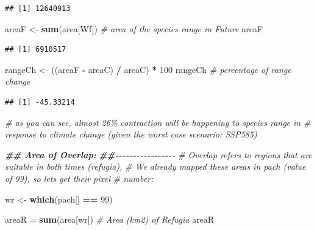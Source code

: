 \documentclass[
]{article}
\newenvironment{Shaded}{\begin{snugshade}}{\end{snugshade}}
\newcommand{\CommentTok}[1]{\textcolor[rgb]{0.56,0.35,0.01}{\textit{#1}}}
\newcommand{\DecValTok}[1]{\textcolor[rgb]{0.00,0.00,0.81}{#1}}
\newcommand{\DocumentationTok}[1]{\textcolor[rgb]{0.56,0.35,0.01}{\textbf{\textit{#1}}}}
\newcommand{\FunctionTok}[1]{\textcolor[rgb]{0.13,0.29,0.53}{\textbf{#1}}}
\newcommand{\NormalTok}[1]{#1}
\newcommand{\OtherTok}[1]{\textcolor[rgb]{0.56,0.35,0.01}{#1}}
\newcommand{\SpecialCharTok}[1]{\textcolor[rgb]{0.81,0.36,0.00}{\textbf{#1}}}
\begin{document}
\begin{verbatim}
## [1] 12640913
\end{verbatim}

\begin{Shaded}
\begin{Highlighting}[]
\NormalTok{areaF }\OtherTok{\textless{}{-}} \FunctionTok{sum}\NormalTok{(area[Wf]) }\CommentTok{\# area of the species range in Future}
\NormalTok{areaF}
\end{Highlighting}
\end{Shaded}

\begin{verbatim}
## [1] 6910517
\end{verbatim}

\begin{Shaded}
\begin{Highlighting}[]
\NormalTok{rangeCh }\OtherTok{\textless{}{-}}\NormalTok{ ((areaF }\SpecialCharTok{{-}}\NormalTok{ areaC) }\SpecialCharTok{/}\NormalTok{ areaC) }\SpecialCharTok{*} \DecValTok{100}
\NormalTok{rangeCh }\CommentTok{\# percentage of range change }
\end{Highlighting}
\end{Shaded}

\begin{verbatim}
## [1] -45.33214
\end{verbatim}

\begin{Shaded}
\begin{Highlighting}[]
\CommentTok{\# as you can see, almost 26\% contraction will be happening to species range in }
\CommentTok{\# response to climate change (given the worst case scenario: SSP585)}

\DocumentationTok{\#\# Area of Overlap:}
\DocumentationTok{\#\#{-}{-}{-}{-}{-}{-}{-}{-}{-}{-}{-}{-}{-}{-}{-}{-}{-}}
\CommentTok{\# Overlap refers to regions that are suitable in both times (refugia), }
\CommentTok{\# We already mapped these areas in pach (value of 99), so let\textquotesingle{}s get their pixel}
\CommentTok{\# number:}

\NormalTok{wr }\OtherTok{\textless{}{-}} \FunctionTok{which}\NormalTok{(pach[] }\SpecialCharTok{==} \DecValTok{99}\NormalTok{)}

\NormalTok{areaR }\OtherTok{=} \FunctionTok{sum}\NormalTok{(area[wr]) }\CommentTok{\# Area (km2) of Refugia}
\NormalTok{areaR}
\end{Highlighting}
\end{Shaded}
\end{document}
